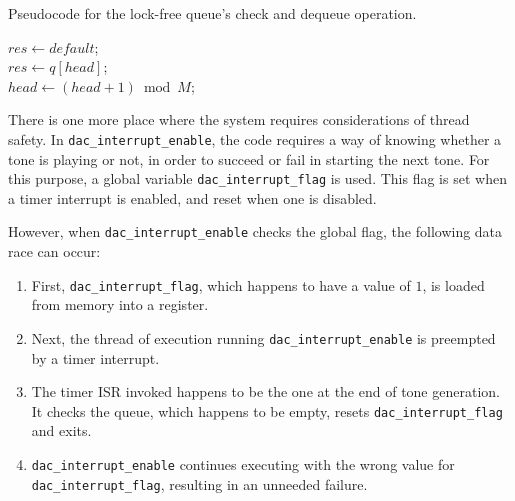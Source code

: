 \documentclass[11pt,a4paper,twocolumn]{scrartcl}
\begin{document}
\begin{algorithm}
   \caption{Pseudocode for the lock-free queue's check and dequeue operation.}\label{alg:check_dequeue}
      $res \gets default$;\\
      {
         $res \gets q[head]$;\\
         $head \gets (head + 1) \bmod M$;
      }
\end{algorithm}

There is one more place where the system requires considerations of thread safety. In \verb!dac_interrupt_enable!, the code requires a way of knowing whether a tone is playing or not, in order to succeed or fail in starting the next tone. For this purpose, a global variable \verb!dac_interrupt_flag! is used. This flag is set when a timer interrupt is enabled, and reset when one is disabled.

However, when \verb!dac_interrupt_enable! checks the global flag, the following data race can occur:
\begin{enumerate}
   \item First, \verb!dac_interrupt_flag!, which happens to have a value of $1$, is loaded from memory into a register.
   \item Next, the thread of execution running \verb!dac_interrupt_enable! is preempted by a timer interrupt.
   \item The timer ISR invoked happens to be the one at the end of tone generation. It checks the queue, which happens to be empty, resets \verb!dac_interrupt_flag! and exits.
   \item \verb!dac_interrupt_enable! continues executing with the wrong value for \verb!dac_interrupt_flag!, resulting in an unneeded failure.
\end{enumerate}
\end{document}
